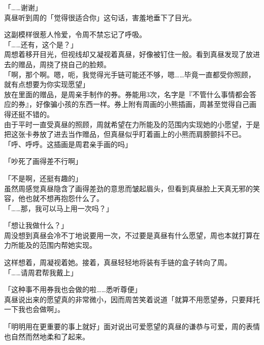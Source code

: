 「……谢谢」\\

真昼听到周的「觉得很适合你」这句话，害羞地垂下了目光。

这副模样很惹人怜爱，令周不禁忘记了呼吸。\\

「……还有，这个是？」\\

周想着移开目光，但视线却又凝视着真昼，好像被钉住一般。看到真昼发现了放进去的赠品，周挠了挠自己的脸颊。\\

「啊，那个啊。嗯，呃，我觉得光手链可能还不够，嗯……毕竟一直都受你照顾，就有点想要为你实现愿望」\\

放在里面的赠品，是周亲手制作的券。券能用3次，名字是『不管什么事情都会答应的券』，好像骗小孩的东西一样。券上附有周画的小熊插画，周甚至觉得自己画得还挺不错的。\\

由于平时一直受真昼的照顾，周就希望在力所能及的范围内实现她的小愿望，于是把这张卡券放了进去当作赠品，但真昼似乎盯着画上的小熊而肩膀颤抖不已。\\

「呼、呼呼。这插画是周君亲手画的吗」

「吵死了画得差不行啊」

「不是啊，还挺有趣的」\\

虽然周感觉真昼隐含了画得差劲的意思而皱起眉头，但看到真昼脸上天真无邪的笑容，他也就不想再抱怨什么了。\\

「……那，我可以马上用一次吗？」

「想让我做什么？」\\

周没想到真昼会冷不丁地说要用一次，不过要是真昼有什么愿望，周也本就打算在力所能及的范围内帮她实现。

这样想着，周凝视着她。接着，真昼轻轻地将装有手链的盒子转向了周。\\

「……请周君帮我戴上」

「这种事不用券我也会做的啦……悉听尊便」\\

真昼说出来的愿望真的非常微小，因而周苦笑着说道「就算不用愿望券，只要拜托一下我也会做啊」。

「明明用在更重要的事上就好」面对说出可爱愿望的真昼的谦恭与可爱，周的表情也自然而然地柔和了起来。\\

